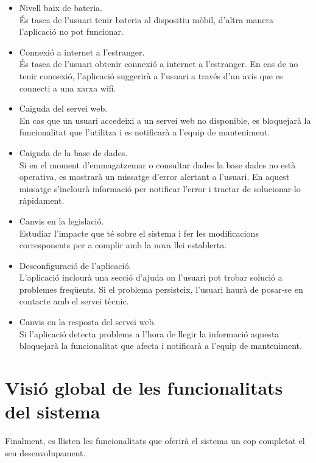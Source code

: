 \begin{itemize}

\item{}Nivell baix de bateria.\\
És tasca de l'usuari tenir bateria al dispositiu mòbil, d'altra manera l'aplicació no pot funcionar.
\item{}Connexió a internet a l'estranger.\\
És tasca de l'usuari obtenir connexió a internet a l'estranger. En cas de no tenir connexió, l'aplicació suggerirà a l'usuari a través d'un avís que es connecti a una xarxa wifi.
\item{}Caiguda del servei web.\\
En cas que un usuari accedeixi a un servei web no disponible, es bloquejarà la funcionalitat que l'utilitza i es notificarà a l'equip de manteniment.
\item{}Caiguda de la base de dades.\\
Si en el moment d'emmagatzemar o consultar dades la base dades no està
operativa, es mostrarà un missatge d'error alertant a l'usuari. En aquest
missatge s'inclourà informació per notificar l'error i tractar de solucionar-lo ràpidament.
\item{}Canvis en la legislació.\\
Estudiar l'impacte que té sobre el sistema i fer les modificacions corresponents per a complir amb la nova llei establerta.
\item{}Desconfiguració de l'aplicació.\\
L'aplicació inclourà una secció d'ajuda on l'usuari pot trobar solució a
problemes freqüents. Si el problema persisteix, l'usuari haurà de posar-se
en contacte amb el servei tècnic.
\item{}Canvis en la resposta del servei web.\\
Si l'aplicació detecta problems a l'hora de llegir la informació aquesta bloquejarà la funcionalitat que afecta i notificarà a l'equip de manteniment.
\end{itemize}

\section{Visió global de les funcionalitats del sistema}
Finalment, es llisten les funcionalitats que oferirà el sistema un cop completat el seu desenvolupament.

